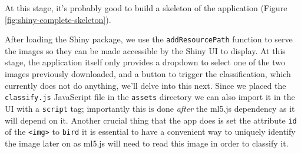 \documentclass[10pt,]{krantz}
\begin{document}
At this stage, it's probably good to build a skeleton of the application (Figure \ref{fig:shiny-complete-skeleton}).

After loading the Shiny package, we use the \texttt{addResourcePath} function to serve the images so they can be made accessible by the Shiny UI to display. At this stage, the application itself only provides a dropdown to select one of the two images previously downloaded, and a button to trigger the classification, which currently does not do anything, we'll delve into this next. Since we placed the \texttt{classify.js} JavaScript file in the \texttt{assets} directory we can also import it in the UI with a \texttt{script} tag; importantly this is done \emph{after} the ml5.js dependency as it will depend on it. Another crucial thing that the app does is set the attribute \texttt{id} of the \texttt{\textless{}img\textgreater{}} to \texttt{bird} it is essential to have a convenient way to uniquely identify the image later on as ml5.js will need to read this image in order to classify it.
\end{document}
